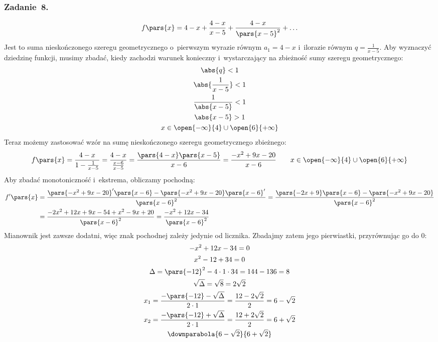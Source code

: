 \subsubsection*{Zadanie~8.}
\begin{equation*}
    f\pars{x} = 4 - x + \frac{4 - x}{x - 5} + \frac{4 - x}{\pars{x - 5}^2} + \ldots
\end{equation*}
Jest to suma nieskończonego szeregu geometrycznego o~pierwszym wyrazie równym \(a_1 = 4 - x\) i~ilorazie równym \(q = \frac{1}{x - 5}\). Aby wyznaczyć dziedzinę funkcji, musimy zbadać, kiedy zachodzi warunek konieczny i~wystarczający na zbieżność sumy szeregu geometrycznego:
\begin{gather*}
    \abs{q} < 1\\
    \abs{\frac{1}{x - 5}} < 1\\
    \frac{1}{\abs{x - 5}} < 1\\
    \abs{x - 5} > 1\\
    x \in \open{-\infty}{4} \cup \open{6}{+\infty}
\end{gather*}
Teraz możemy zastosować wzór na sumę nieskończonego szeregu geometrycznego zbieżnego:
\begin{equation*}
    f\pars{x}
        = \frac{4 - x}{1 - \frac{1}{x - 5}}
        = \frac{4 - x}{\frac{x - 6}{x - 5}}
        = \frac{\pars{4 - x}\pars{x - 5}}{x - 6}
        = \frac{-x^2 + 9x - 20}{x - 6} \qquad x \in \open{-\infty}{4} \cup \open{6}{+\infty}
\end{equation*}
Aby zbadać monotoniczność i~ekstrema, obliczamy pochodną:
\begin{equation*}
    \begin{split}
        f'\pars{x}
            &= \frac{\pars{-x^2 + 9x - 20}'\pars{x - 6} - \pars{-x^2 + 9x - 20}\pars{x - 6}'}{\pars{x - 6}^2}
            = \frac{\pars{-2x + 9}\pars{x - 6} - \pars{-x^2 + 9x - 20}}{\pars{x - 6}^2}\\
            &= \frac{-2x^2 + 12x + 9x - 54 + x^2 - 9x + 20}{\pars{x - 6}^2}
            = \frac{-x^2 + 12x - 34}{\pars{x - 6}^2}
    \end{split}
\end{equation*}
Mianownik jest zawsze dodatni, więc znak pochodnej zależy jedynie od licznika. Zbadajmy zatem jego pierwiastki, przyrównując go do \(0\):
\begin{gather*}
    -x^2 + 12x - 34 = 0\\
    x^2 - 12 + 34 = 0\\
    \Delta
        = \pars{-12}^2 - 4 \cdot 1 \cdot 34
        = 144 - 136
        = 8\\
    \sqrt{\Delta} = \sqrt{8} = 2\sqrt{2}\\
    x_1
        = \frac{-\pars{-12} - \sqrt{\Delta}}{2 \cdot 1}
        = \frac{12 - 2\sqrt{2}}{2}
        = 6 - \sqrt{2}\\
    x_2
        = \frac{-\pars{-12} + \sqrt{\Delta}}{2 \cdot 1}
        = \frac{12 + 2\sqrt{2}}{2}
        = 6 + \sqrt{2}\\
    \downparabola{6 - \sqrt{2}}{6 + \sqrt{2}}
\end{gather*}
